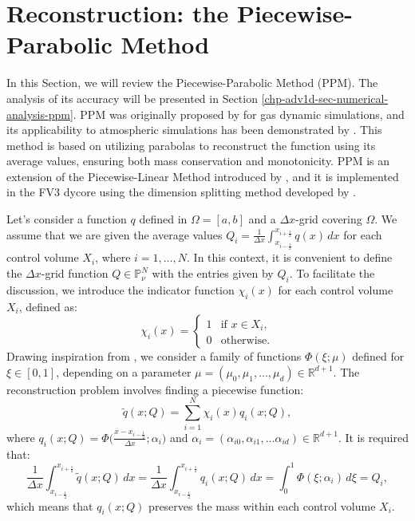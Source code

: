 \section{Reconstruction: the Piecewise-Parabolic Method}
\label{chp-adv1d-sec-recon}
In this Section, we will review the Piecewise-Parabolic Method (PPM).
The analysis of its accuracy will be presented in Section \ref{chp-adv1d-sec-numerical-analysis-ppm}.
PPM was originally proposed by \citet{colella:1984} for gas dynamic simulations, and its applicability
to atmospheric simulations has been demonstrated by \citet{carpenter:1990}.
This method is based on utilizing parabolas to reconstruct the function using its average values,
ensuring both mass conservation and monotonicity. PPM is an extension of the Piecewise-Linear Method
introduced by \citet{vanleer:1977}, and it is implemented in the FV3 dycore using the dimension
splitting method developed by \citet{lin:1996}.

Let's consider a function ${q}$ defined in $\Omega=[a,b]$ and a $\Delta x$-grid covering $\Omega$.
We assume that we are given the average values ${Q}_i = \frac{1}{\Delta x} \int_{x_{i-\frac{1}{2}}}^{x_{i+\frac{1}{2}}} {q}(x) \,dx$
for each control volume $X_i$, where $i = 1, \ldots, N$.
In this context, it is convenient to define the $\Delta x$-grid function $Q\in \mathbb{P}^{N}_{\nu}$ with the entries given by $Q_i$.
To facilitate the discussion, we introduce the indicator function $\chi_{i}(x)$ for each control volume $X_i$, defined as:
\begin{equation*}
	\label{chp-adv1d-sec3-1-eq1}
	\chi_{i}(x)=
	\begin{cases}
		1 & \text{if } x \in X_i,\\
		0 & \text{otherwise.}
	\end{cases}
\end{equation*}
Drawing inspiration from \citet[Chapter~1]{stoer:2002}, we consider a family of functions $\Phi(\xi;\mu)$
defined for $\xi \in [0,1]$, depending on a parameter $\mu =(\mu_0, \mu_1,\ldots, \mu_d)\in \mathbb{R}^{d+1}$.
The reconstruction problem involves finding a piecewise function:
\begin{equation}
	\label{chp-adv1d-sec3-1-eq2}
	\tilde{q}(x;Q) = \sum_{i=1}^{N} \chi_i(x) q_i(x;Q),
\end{equation}
where $q_i(x;Q) = \Phi\big(\frac{x-x_{i-\frac{1}{2}}}{\Delta x};\alpha_i\big)$ and
$\alpha_i= (\alpha_{i0},\alpha_{i1}, \ldots \alpha_{id})\in\mathbb{R}^{d+1}$. It is required that:
\begin{equation*}
	\frac{1}{\Delta x}\int_{x_{i-\frac{1}{2}}}^{x_{i+\frac{1}{2}}} \tilde{q}(x;Q) \,dx =
	\frac{1}{\Delta x}\int_{x_{i-\frac{1}{2}}}^{x_{i+\frac{1}{2}}} q_i(x;Q) \,dx =
	\int_{0}^{1} \Phi(\xi;\alpha_i) \,d\xi = {Q}_i,
\end{equation*}
which means that $q_i(x;Q)$ preserves the mass within each control volume $X_i$.

